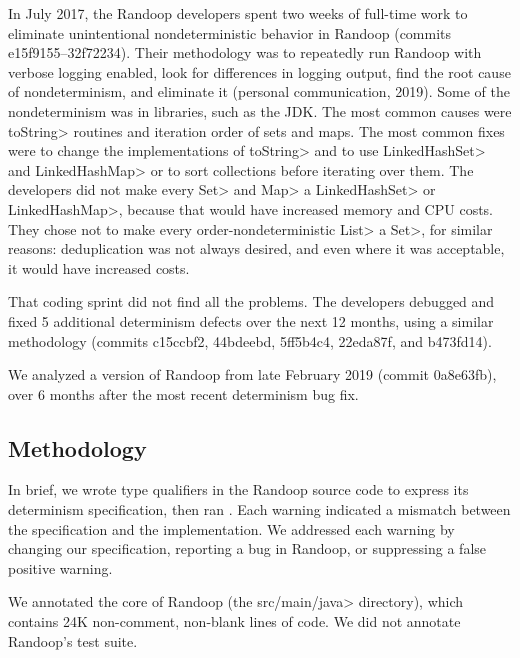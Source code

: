 In July 2017, the Randoop developers spent two weeks of full-time work to
eliminate unintentional nondeterministic behavior in Randoop (commits e15f9155--32f72234).
Their methodology was to repeatedly
 run Randoop with verbose logging enabled,
 look for differences in logging output,
 find the root cause of nondeterminism,
 and eliminate it (personal communication, 2019).
Some of the nondeterminism was in libraries, such as the JDK\@.
The most common causes were \<toString> routines and iteration order of sets and maps.
The most common fixes were to change the implementations of \<toString>
and to use \<LinkedHashSet> and \<LinkedHashMap> or to sort collections
before iterating over them.
The developers did not make every \<Set> and \<Map> a \<LinkedHashSet> or \<LinkedHashMap>, because that
would have increased memory and CPU costs.  They chose not to make every
order-nondeterministic \<List> a \<Set>, for similar reasons:  deduplication was
not always desired, and even where it was acceptable, it would have increased costs.

That coding sprint did not find all the problems.
The developers debugged and fixed 5 additional determinism defects over the
next 12 months, using a similar methodology
(commits c15ccbf2, 44bdeebd, 5ff5b4c4, 22eda87f, and b473fd14).


We analyzed a version of Randoop from late February 2019 (commit 0a8e63fb), over 6 months after the most recent determinism bug fix.


\subsection{Methodology}

In brief, we wrote type qualifiers in the Randoop source code to express its
determinism specification,
then ran
\theDeterminismChecker.  Each warning indicated a mismatch between the
specification and the implementation.  We addressed each warning by changing our
specification, reporting a bug in Randoop, or suppressing a false positive warning.

We annotated the core of Randoop (the \<src/main/java> directory), which
contains 24K non-comment, non-blank lines of code.
We did not annotate Randoop's test suite.

